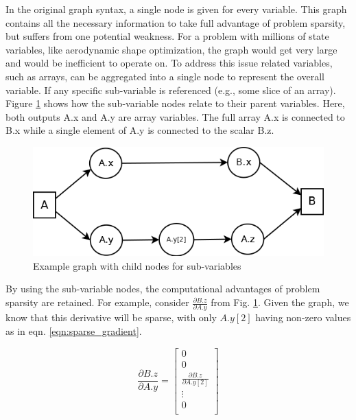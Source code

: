 \documentclass[]{aiaa-tc} %
\begin{document}
    In the original graph syntax, a single node is given for every variable. This graph contains all the 
    necessary information to take full advantage of problem sparsity, but suffers from one potential 
    weakness. For a problem with millions of state variables, like aerodynamic shape optimization, 
    the graph would get very large and would be inefficient to operate on. To address this issue 
    related variables, such as arrays, can be aggregated into a single node to represent the 
    overall variable. If any specific sub-variable is referenced (e.g., some slice of an array). 
    Figure \ref{fig:subvars} shows how the sub-variable nodes relate to their parent variables. Here,
    both outputs A.x and A.y are array variables. The full array A.x is connected to 
    B.x while a single element of A.y is connected to the scalar B.z.

    \begin{figure}[!htb]\begin{center}
      \includegraphics[width=.8\textwidth]{images/Graph1}
      \caption{ Example graph with child nodes for sub-variables \label{fig:subvars}}
    \end{center}\end{figure}

    By using the sub-variable nodes, the computational advantages of problem sparsity are retained. For example,
    consider $\frac{\partial B.z}{\partial A.y}$ from Fig. \ref{fig:subvars}. Given the graph, we know that
    this derivative will be sparse, with only $A.y[2]$ having non-zero values as in eqn.  \ref{eqn:sparse_gradient}. 

    \begin{equation}
        \frac{\partial B.z}{\partial A.y} =
        \begin{bmatrix}
            0 \\
            0 \\
            \frac{\partial B.z}{\partial A.y[2]} \\
            \vdots \\
            0 \\
        \end{bmatrix}
        \label{eqn:sparse_gradient}
    \end{equation}
\end{document}
